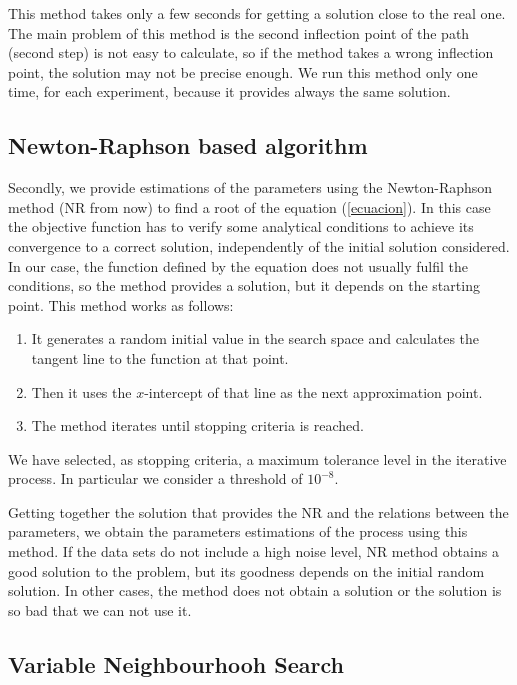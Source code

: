 \documentclass{sig-alternate}
\begin{document}
This method takes only a few seconds for getting a solution close to the real one. The main problem of this method is the second inflection point of the path (second step) is not easy to calculate, so if the method takes a wrong inflection point, the solution may not be precise enough. We run this method only one time, for each experiment, because it provides always the same solution.

\subsection{Newton-Raphson based algorithm}
\label{subsec:NRS}

Secondly, we provide estimations of the parameters using the Newton-Raphson method (NR from now) to find a root of the equation (\ref{ecuacion}). In this case the objective function has to verify some analytical conditions to achieve its convergence to a correct solution, independently of the initial solution considered. In our case, the function defined by the equation does not usually fulfil the conditions, so the method provides a solution, but it depends on the starting point. This method works as follows:


\begin{enumerate}
\item It generates a random initial value in the search space and calculates the tangent line to the function at that point.
\item Then it uses the $x$-intercept of that line as the next approximation point.
\item The method iterates until stopping criteria is reached.
\end{enumerate}

We have selected, as stopping criteria, a maximum tolerance level in the iterative process. In particular we consider a threshold of $10^{-8}$.

Getting together the solution that provides the NR and the relations between the parameters, we obtain the parameters estimations of the process using this method. If the data sets do not include a high noise level, NR method obtains a good solution to the problem, but its goodness depends on the initial random solution. In other cases, the method does not obtain a solution or the solution is so bad that we can not use it.



\subsection{Variable Neighbourhooh Search}
\end{document}
